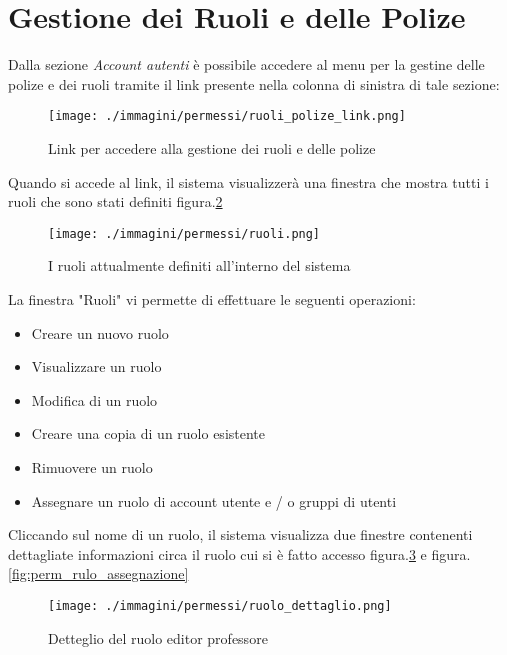 \section{Gestione dei Ruoli e delle Polize}


Dalla sezione \textsl{Account autenti} è possibile accedere al menu per la gestine delle polize e dei ruoli tramite il link presente nella colonna di sinistra di tale sezione:
\begin{figure}[H]
 \centering
 \texttt{[image: ./immagini/permessi/ruoli\_polize\_link.png]}
 \caption{Link per accedere alla gestione dei ruoli e delle polize}
 \label{fig:perm_link}
\end{figure}

Quando si accede al link, il sistema visualizzerà una finestra che mostra tutti i ruoli che sono
stati definiti figura.\ref{fig:perm_tutti_ruoli}

\begin{figure}[H]
 \centering
 \texttt{[image: ./immagini/permessi/ruoli.png]}
 \caption{I ruoli attualmente definiti all'interno del sistema}
 \label{fig:perm_tutti_ruoli}
\end{figure}

La finestra "Ruoli" vi permette di effettuare le seguenti operazioni:
\begin{itemize}
  \item Creare un nuovo ruolo
  \item Visualizzare un ruolo 
  \item Modifica di un ruolo 
  \item Creare una copia di un ruolo esistente 
  \item  Rimuovere un ruolo 
  \item Assegnare un ruolo di account utente e / o gruppi di utenti 
\end{itemize}

Cliccando sul nome di un ruolo, il sistema visualizza due finestre contenenti dettagliate
informazioni circa il ruolo cui si è fatto accesso figura.\ref{fig:perm_ruolo_open} e figura.\ref{fig:perm_rulo_assegnazione}

\begin{figure}[H]
 \centering
 \texttt{[image: ./immagini/permessi/ruolo\_dettaglio.png]}
 \caption{Detteglio del ruolo editor professore}
 \label{fig:perm_ruolo_open}
\end{figure}

